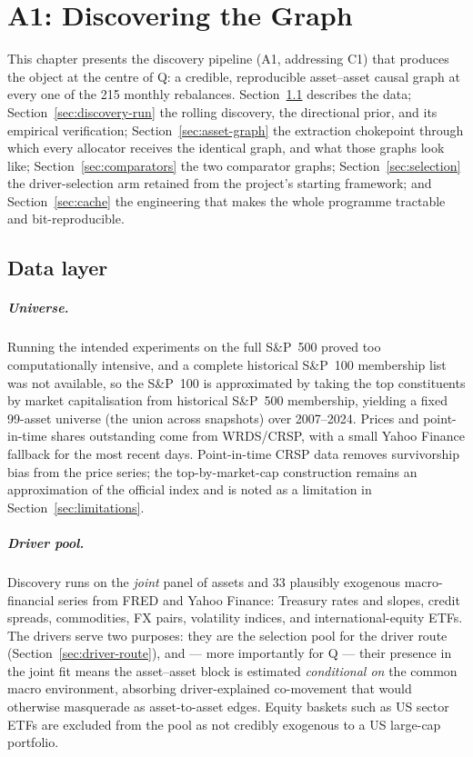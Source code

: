 \chapter{A1: Discovering the Graph}
\label{chap:discovery}

This chapter presents the discovery pipeline (A1, addressing C1) that produces
the object at the centre of Q: a credible, reproducible asset--asset causal
graph at every one of the 215 monthly rebalances. Section~\ref{sec:data}
describes the data; Section~\ref{sec:discovery-run} the rolling discovery, the
directional prior, and its empirical verification;
Section~\ref{sec:asset-graph} the extraction chokepoint through which every
allocator receives the identical graph, and what those graphs look like;
Section~\ref{sec:comparators} the two comparator graphs;
Section~\ref{sec:selection} the driver-selection arm retained from the
project's starting framework; and Section~\ref{sec:cache} the engineering that
makes the whole programme tractable and bit-reproducible.

\section{Data layer}
\label{sec:data}

\paragraph{Universe.} Running the intended experiments on the full S\&P~500
proved too computationally intensive, and a complete historical S\&P~100
membership list was not available, so the S\&P~100 is approximated by taking
the top constituents by market capitalisation from historical S\&P~500
membership, yielding a fixed 99-asset universe (the union across snapshots)
over 2007--2024. Prices and point-in-time shares outstanding come from
WRDS/CRSP, with a small Yahoo Finance fallback for the most recent days.
Point-in-time CRSP data removes survivorship bias from the price series; the
top-by-market-cap construction remains an approximation of the official index
and is noted as a limitation in Section~\ref{sec:limitations}.

\paragraph{Driver pool.} Discovery runs on the \emph{joint} panel of assets
and 33 plausibly exogenous macro-financial series from FRED and Yahoo Finance:
Treasury rates and slopes, credit spreads, commodities, FX pairs, volatility
indices, and international-equity ETFs. The drivers serve two purposes: they
are the selection pool for the driver route (Section~\ref{sec:driver-route}),
and --- more importantly for Q --- their presence in the joint fit means the
asset--asset block is estimated \emph{conditional on} the common macro
environment, absorbing driver-explained co-movement that would otherwise
masquerade as asset-to-asset edges. Equity baskets such as US sector ETFs are
excluded from the pool as not credibly exogenous to a US large-cap portfolio.

